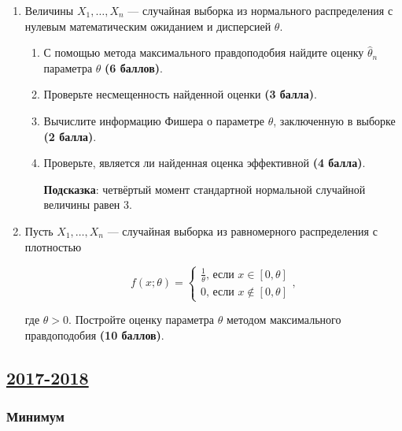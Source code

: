 \begin{enumerate}[resume]
\item Величины $X_{1}, \ldots, X_{n}$ — случайная выборка из нормального распределения с нулевым математическим ожиданием и дисперсией $\theta$.

\begin{enumerate}
\item С помощью метода максимального правдоподобия найдите оценку $\hat{\theta}_{n}$ параметра $\theta$ \textbf{(6 баллов)}.
\item Проверьте несмещенность найденной оценки \textbf{(3 балла)}.
\item Вычислите информацию Фишера о параметре $\theta$, заключенную в выборке \textbf{(2 балла)}.
\item Проверьте, является ли найденная оценка эффективной \textbf{(4 балла)}.

\textbf{Подсказка}: четвёртый момент стандартной нормальной случайной величины равен 3.
\end{enumerate}

\item Пусть $X_{1}, \ldots, X_{n}$ — случайная выборка из равномерного распределения с плотностью


\[
f(x;\theta)=\begin{cases}\frac{1}{\theta}\text{, если }x\in[0,\theta]\\ 0\text{, если }x\notin[0,\theta]\end{cases},
\]

где $\theta>0$. Постройте оценку параметра $\theta$ методом максимального правдоподобия \textbf{(10 баллов)}.

\end{enumerate}



\subsection[2017-2018]{\hyperref[sec:sol_kr_03_2017_2018]{2017-2018}}
\label{sec:kr_03_2017_2018}

\subsubsection*{Минимум}

